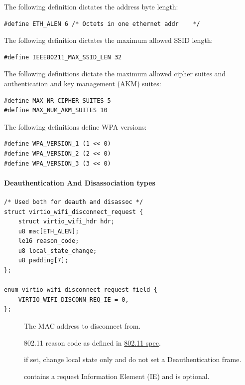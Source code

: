 The following definition dictates the address byte length:

\begin{lstlisting}
#define ETH_ALEN 6 /* Octets in one ethernet addr	 */
\end{lstlisting}

The following definition dictates the maximum allowed SSID length:

\begin{lstlisting}
#define IEEE80211_MAX_SSID_LEN 32
\end{lstlisting}

The following definitions dictate the maximum allowed cipher suites and authentication and key management (AKM) suites:

\begin{lstlisting}
#define MAX_NR_CIPHER_SUITES 5
#define MAX_NUM_AKM_SUITES 10
\end{lstlisting}

\label{def:Device Types / 802.11 Device / Device Operation / Common Definitions / Interface Types / WPA versions}The following definitions define WPA versions:

\begin{lstlisting}
#define WPA_VERSION_1 (1 << 0)
#define WPA_VERSION_2 (2 << 0)
#define WPA_VERSION_3 (3 << 0)
\end{lstlisting}

\paragraph{Deauthentication And Disassociation types}\label{sec:Device Types / 802.11 Device / Device Operation / Common Definitions / Deauthentication And Disassociation types}

\begin{lstlisting}
/* Used both for deauth and disassoc */
struct virtio_wifi_disconnect_request {
	struct virtio_wifi_hdr hdr;
	u8 mac[ETH_ALEN];
	le16 reason_code;
	u8 local_state_change;
	u8 padding[7];
};

enum virtio_wifi_disconnect_request_field {
	VIRTIO_WIFI_DISCONN_REQ_IE = 0,
};
\end{lstlisting}

\begin{description}
\item[] The MAC address to disconnect from.
\item[] 802.11 reason code as defined in \hyperref[intro:IEEE 802.11]{802.11 spec}.
\item[] if set, change local state only and do not set a Deauthentication frame.
\item[] contains a request Information Element (IE) and is optional.
\end{description}

